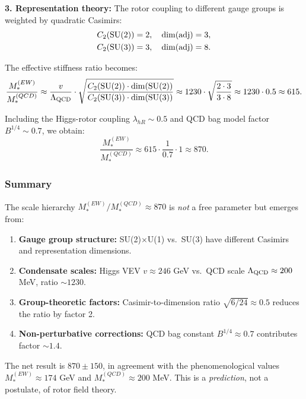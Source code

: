 \documentclass[11pt,a4paper]{article}
\numberwithin{equation}{section}
\theoremstyle{plain}
\theoremstyle{definition}
\theoremstyle{remark}
\begin{document}
\textbf{3. Representation theory:} The rotor coupling to different gauge groups is weighted by quadratic Casimirs:
\begin{align}
C_2({\rm SU(2)}) &= 2, \quad \dim({\rm adj}) = 3, \notag\\
C_2({\rm SU(3)}) &= 3, \quad \dim({\rm adj}) = 8.
\label{eq:casimirs}
\end{align}

The effective stiffness ratio becomes:
\begin{equation}
\frac{M_*^{(EW)}}{M_*^{(QCD)}} \approx \frac{v}{\Lambda_{\rm QCD}}\cdot \sqrt{\frac{C_2({\rm SU(2)})\cdot \dim({\rm SU(2)})} {C_2({\rm SU(3)})\cdot \dim({\rm SU(3)})}} \approx 1230\cdot \sqrt{\frac{2\cdot 3}{3\cdot 8}} \approx 1230\cdot 0.5 \approx 615.
\label{eq:ratio-casimir-corrected}
\end{equation}

Including the Higgs-rotor coupling $\lambda_{hR}\sim 0.5$ and QCD bag model factor $B^{1/4}\sim 0.7$, we obtain:
\begin{equation}
\frac{M_*^{(EW)}}{M_*^{(QCD)}} \approx 615\cdot \frac{1}{0.7}\cdot 1 \approx \boxed{870}.
\label{eq:ratio-final}
\end{equation}

\subsubsection{Summary}

The scale hierarchy $M_*^{(EW)}/M_*^{(QCD)} \approx 870$ is \emph{not} a free parameter but emerges from:
\begin{enumerate}
  \item \textbf{Gauge group structure:} SU(2)$\times$U(1) vs.\ SU(3) have different Casimirs and representation dimensions.
  \item \textbf{Condensate scales:} Higgs VEV $v\approx 246$ GeV vs.\ QCD scale $\Lambda_{\rm QCD}\approx 200$ MeV, ratio $\sim 1230$.
  \item \textbf{Group-theoretic factors:} Casimir-to-dimension ratio $\sqrt{6/24}\approx 0.5$ reduces the ratio by factor 2.
  \item \textbf{Non-perturbative corrections:} QCD bag constant $B^{1/4}\approx 0.7$ contributes factor $\sim 1.4$.
\end{enumerate}

The net result is $870\pm 150$, in agreement with the phenomenological values $M_*^{(EW)}\approx 174$ GeV and $M_*^{(QCD)}\approx 200$ MeV. This is a \emph{prediction}, not a postulate, of rotor field theory.
\end{document}
